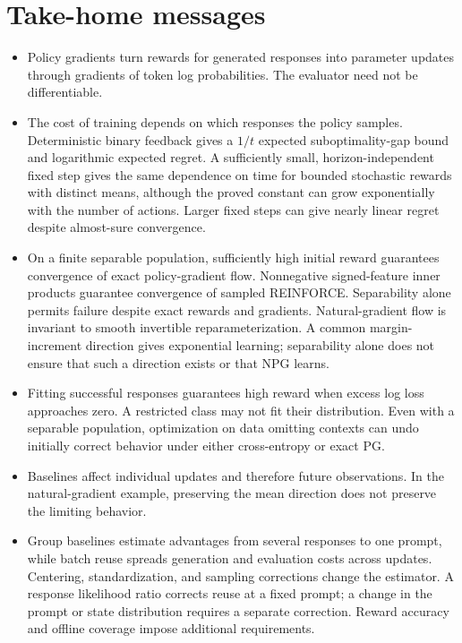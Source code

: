 \documentclass[11pt,twoside]{article}
\theoremstyle{definition}
\theoremstyle{remark}
\begin{document}
\section{Take-home messages}
\label{sec:take-home}
\begin{itemize}[leftmargin=*]
\item Policy gradients turn rewards for generated responses into parameter
updates through gradients of token log probabilities. The evaluator need
not be differentiable.
\item The cost of training depends on which responses the policy samples.
Deterministic binary feedback gives a $1/t$ expected suboptimality-gap bound and
logarithmic expected regret. A sufficiently small, horizon-independent fixed
step gives the same dependence on time for bounded stochastic rewards with
distinct means, although the proved constant can grow exponentially with the
number of actions. Larger fixed steps can give nearly linear regret despite
almost-sure convergence.
\item On a finite separable population, sufficiently high initial reward
guarantees convergence of exact policy-gradient flow. Nonnegative signed-feature
inner products guarantee convergence of sampled REINFORCE. Separability
alone permits failure despite exact rewards and gradients. Natural-gradient flow is
invariant to smooth invertible reparameterization. A common margin-increment
direction gives exponential learning; separability alone does not ensure
that such a direction exists or that NPG learns.
\item Fitting successful responses guarantees high reward when excess
log loss approaches zero. A restricted class may not fit their distribution.
Even with a separable population, optimization on data omitting contexts can
undo initially correct behavior under either cross-entropy or exact PG.
\item Baselines affect individual updates and therefore future observations.
In the natural-gradient example, preserving the mean direction does not
preserve the limiting behavior.
\item Group baselines estimate advantages from several responses to one prompt,
while batch reuse spreads generation and evaluation costs across updates. Centering,
standardization, and sampling corrections change the estimator. A response
likelihood ratio corrects reuse at a fixed prompt; a change in the prompt or
state distribution requires a separate correction. Reward accuracy and
offline coverage impose additional requirements.
\end{itemize}
\end{document}
